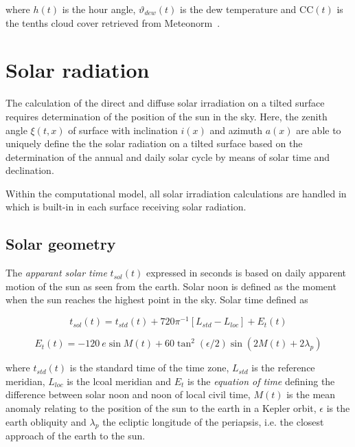 where $h(t)$ is the hour angle, $\vartheta_{dew}(t)$ is the dew temperature and CC$(t)$ is the tenths cloud cover retrieved from Meteonorm~\cite{Kasten1979,Perraudeau1990}. 

\section{Solar radiation}
\label{chap:climsol}

The calculation of the direct and diffuse solar irradiation on a tilted surface requires determination of the position of the sun in the sky. Here, the zenith angle $\xi(t,x)$ of surface with inclination $i(x)$ and azimuth $a(x)$ are able to uniquely define the the solar radiation on a tilted surface based on the determination of the annual and daily solar cycle by means of solar time and declination.

Within the computational model, all solar irradiation calculations are handled in  which is built-in in each surface receiving solar radiation.

\subsection{Solar geometry}

The \emph{apparant solar time} $t_{sol}(t)$ expressed in seconds is based on daily apparent motion of the sun as seen from the earth. Solar noon is defined as the moment when the sun reaches the highest point in the sky. Solar time defined as

\begin{equation}
t_{sol}(t) = t_{std}(t) + 720\pi^{-1}\left[L_{std}-L_{loc}\right] + E_{t}(t)
\end{equation}

\begin{equation}
E_{t}(t) = -120\ e\sin M(t) + 60\tan^{2} \left(\epsilon/2\right) \sin \left(2M(t)+2\lambda_{p}\right)
\end{equation}

where $t_{std}(t)$ is the standard time of the time zone, $L_{std}$ is the reference meridian, $L_{loc}$ is the lcoal meridian and $E_{t}$ is the \emph{equation of time} defining the difference between solar noon and noon of local civil time, $M(t)$ is the mean anomaly relating to the position of the sun to the earth in a Kepler orbit, $\epsilon$ is the earth obliquity and $\lambda_{p}$ the ecliptic longitude of the periapsis, i.e. the closest approach of the earth to the sun.

